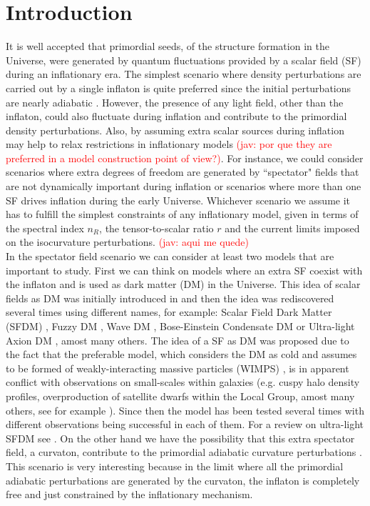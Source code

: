 \documentclass[amssymb,twocolumn,prd,nofootinbib,showpacs]{revtex4-1}
\newcommand{\jav}[1]{\textcolor{red}{(jav: #1)}}
\begin{document}
\section{Introduction}
\label{introduction}
It is well accepted that primordial seeds, of the structure formation in the Universe, were generated by quantum 
fluctuations provided by a scalar field (SF) during an inflationary era. 
The simplest scenario where density perturbations are carried out by a single inflaton is quite preferred since the initial 
perturbations are nearly adiabatic \cite{const1,const2,planck}. However, the presence of any light field, other than the inflaton, 
could also fluctuate during inflation and contribute to the primordial density perturbations. 
%
Also, by assuming extra scalar sources during inflation may help to relax restrictions in inflationary models
\jav{por que they are preferred in a model construction point of view?}.
For instance, we could consider scenarios where extra degrees of freedom are generated by ``spectator" 
fields that are not dynamically important during inflation or scenarios where more than one SF drives inflation 
during the early Universe. 
%
Whichever scenario we assume it has to fulfill the simplest constraints of any inflationary model, given in terms of the 
spectral index $n_R$, the tensor-to-scalar ratio $r$ and the current limits imposed on the isocurvature perturbations. 
\jav{aqui me quede}
\\

In the spectator field scenario we can consider at least two models that are important to study. First we can think on models where an extra SF coexist with the inflaton and is used as dark matter (DM) in the Universe. This idea of scalar fields as DM was initially introduced in \cite{SF1} and then the idea was rediscovered several times using different names, for example: Scalar Field Dark Matter  (SFDM)  \cite{SF2},  Fuzzy  DM  \cite{SF3}, Wave DM \cite{SF4,SF5}, Bose-Einstein
Condensate DM \cite{SF6} or Ultra-light Axion DM
\cite{SF7,SF8}, amost many others. The idea of a SF as DM was proposed due to the fact that the preferable model, which considers the DM as cold and assumes to be formed of weakly-interacting massive particles (WIMPS) \cite{LCDM1,LCDM2}, is in apparent conflict with observations on small-scales within galaxies (e.g. cuspy halo density profiles, overproduction of satellite dwarfs within the Local Group, amost many others, see for example \cite{problem1,problem2,problem3,problem4,problem5}). Since then the model has been tested several times with different observations being successful in each of them. For a review on ultra-light SFDM see \cite{SF9,SF10,SF11,SF12}. On the other hand we have the possibility that this extra spectator field, a curvaton, contribute to the primordial adiabatic curvature perturbations \cite{curv1,curv2,curv3}. This scenario is very interesting because in the limit where all the primordial adiabatic perturbations are generated by the curvaton, the inflaton is completely free and just constrained by the inflationary mechanism.
\end{document}
